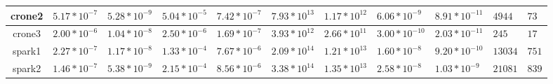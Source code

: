 \documentclass[10pt,a4paper]{article}
\begin{document}
\begin{table}[h]
{\begin{tabular}{|c|l|l|l|l|l|l|l|l|l|l|}
    crone2          & $5.17*10^{-7}$                         & $5.28*10^{-9}$ & $5.04*10^{-5}$ & $7.42*10^{-7}$ & $7.93*10^{13}$ & $1.17*10^{12}$ & $6.06*10^{-9}$ & $8.91*10^{-11}$ & $4944$  & $73$  \\ \hline
    crone3          & $2.00*10^{-6}$                         & $1.04*10^{-8}$ & $2.50*10^{-6}$ & $1.69*10^{-7}$ & $3.93*10^{12}$ & $2.66*10^{11}$ & $3.00*10^{-10}$ & $2.03*10^{-11}$ & $245$   & $17$  \\ \hline
    spark1          & $2.27*10^{-7}$                         & $1.17*10^{-8}$ & $1.33*10^{-4}$ & $7.67*10^{-6}$ & $2.09*10^{14}$ & $1.21*10^{13}$ & $1.60*10^{-8}$ & $9.20*10^{-10}$ & $13034$ & $751$ \\ \hline
    spark2          & $1.46*10^{-7}$                         & $5.38*10^{-9}$ & $2.15*10^{-4}$ & $8.56*10^{-6}$ & $3.38*10^{14}$ & $1.35*10^{13}$ & $2.58*10^{-8}$ & $1.03*10^{-9}$ & $21081$ & $839$ \\ \hline
    \end{tabular}%
    }
\end{table}
\end{document}
